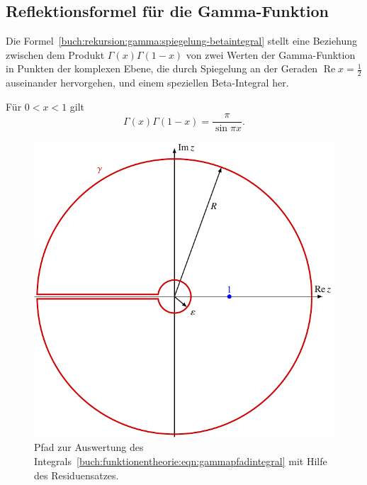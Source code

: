 %
%
%
\subsection{Reflektionsformel für die Gamma-Funktion
\label{buch:funktionentheorie:subsection:gammareflektion}}
Die Formel~\eqref{buch:rekursion:gamma:spiegelung-betaintegral}
stellt eine Beziehung zwischen dem Produkt $\Gamma(x)\Gamma(1-x)$
von zwei Werten der Gamma-Funktion in Punkten der komplexen Ebene,
die durch Spiegelung an der Geraden $\operatorname{Re}x=\frac12$
auseinander hervorgehen, und einem speziellen Beta-Integral her.

\begin{satz}
Für $0<x<1$ gilt
\begin{equation}
\Gamma(x)\Gamma(1-x)
=
\frac{\pi}{\sin\pi x}.
\end{equation}
\end{satz}

\begin{figure}
\centering
\includegraphics{chapters/080-funktionentheorie/images/gammapfad.pdf}
\caption{Pfad zur Auswertung des
Integrals~\eqref{buch:funktionentheorie:eqn:gammapfadintegral}
mit Hilfe des Residuensatzes.
\label{buch:funktionentheorie:fig:gammapfad}}
\end{figure}

